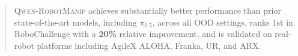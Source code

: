 \documentclass{article} %
\newcommand{\ours}{\textsc{Qwen-RobotManip}\xspace}
\begin{document}
\begin{abstract}
\ours achieves substantially better performance than prior state-of-the-art models, including $\pi_{0.5}$, across all OOD settings, ranks 1st in RoboChallenge with a \textbf{20\%} relative improvement, and is validated on real-robot platforms including AgileX ALOHA, Franka, UR, and ARX.



\end{abstract}
\end{document}
